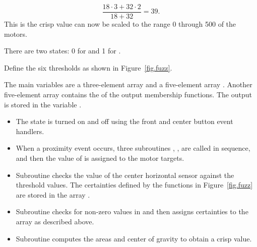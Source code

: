 \begin{displaymath}
\frac{18\cdot 3 + 32\cdot 2}{18+32}=39.
\end{displaymath}
This is the crisp value can now be scaled to the range 0
through 500 of the motors.


There are two states: 0 for  and 1 for .


Define the six thresholds as shown in Figure~\ref{fig.fuzz}.


The main variables are a three-element array  and a
five-element array . Another five-element array contains
the  of the output membership functions. The output is stored
in the variable .


\begin{itemize}

\item The state is turned on and off using the front and center button event handlers.

\item When a proximity event occurs, three subroutines ,
,  are called in sequence, and then the
value of  is assigned to the motor targets.

\item Subroutine  checks the value of the center horizontal
sensor against the threshold values. The certainties defined by the
functions in Figure~\ref{fig.fuzz} are stored in the array .

\item Subroutine  checks for non-zero values in
 and then assigns certainties to the array 
as described above.

\item Subroutine  computes the areas and center of gravity
to obtain a crisp value.

\end{itemize}


